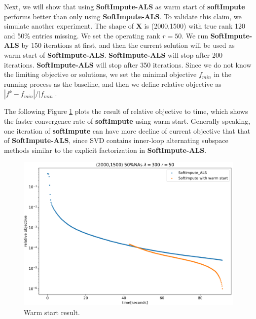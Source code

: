 \documentclass[11pt]{article}
\begin{document}
	Next, we will show that using \textbf{SoftImpute-ALS} as warm start of \textbf{softImpute} performs better than only using \textbf{SoftImpute-ALS}. To validate this claim, we simulate another experiment. The shape of $\boldsymbol{X}$ is (2000,1500) with true rank 120 and 50\% entries missing. We set the operating rank $r=50$. We run \textbf{SoftImpute-ALS} by 150 iterations at first, and then the current solution will be used as warm start of \textbf{SoftImpute-ALS}. \textbf{SoftImpute-ALS} will stop after 200 iterations. \textbf{SoftImpute-ALS} will stop after 350 iterations. Since we do not know the limiting objective or solutions, we set the minimal objective $f_{min}$ in the running process as the baseline, and then we define relative objective as $|f^k-f_{min}|/|f_{min}|$. 
	
	The following Figure \ref{fig:2} plots the result of relative objective to time, which shows the faster convergence rate of \textbf{softImpute} using warm start. Generally speaking, one iteration of \textbf{softImpute} can have more decline of current objective that that of \textbf{SoftImpute-ALS}, since SVD contains inner-loop alternating subspace methods similar to the explicit factorization in \textbf{SoftImpute-ALS}.
	
\begin{figure}[ht!]\centering
	\includegraphics[scale=0.35]{warm_start.png}
	\caption{Warm start result. }
	\label{fig:2}	                                                    
\end{figure}
\end{document}

